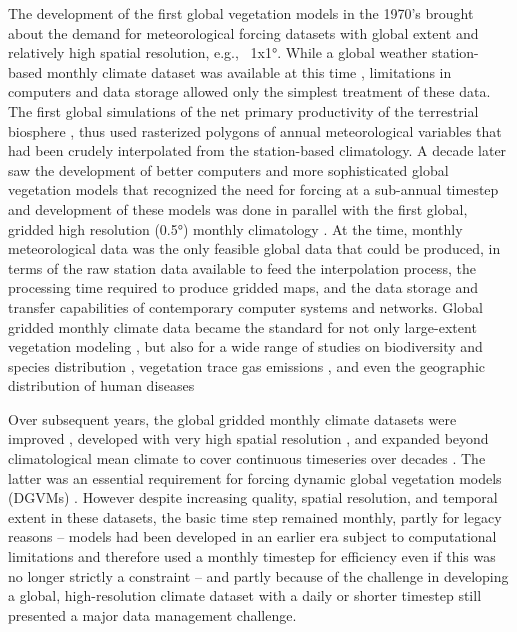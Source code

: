 \begin{refsection}
The development of the first global vegetation models in the 1970’s \citep[e.g.][]{Lieth1975} brought about the demand for meteorological forcing datasets with global extent and relatively high spatial resolution, e.g., ~1x1°. While a global weather station-based monthly climate dataset was available at this time \citep{WalterLieth1967}, limitations in computers and data storage allowed only the simplest treatment of these data. The first global simulations of the net primary productivity of the terrestrial biosphere \citep{Lieth1975}, thus used rasterized polygons of annual meteorological variables that had been crudely interpolated from the station-based climatology. A decade later saw the development of better computers and more sophisticated global vegetation models \citep{PrenticeCramerHarrisonEtAl1992, Prentice1989} that recognized the need for forcing at a sub-annual timestep and development of these models was done in parallel with the first global, gridded high resolution (0.5°) monthly climatology \citep{LeemansCramer1991}. At the time, monthly meteorological data was the only feasible global data that could be produced, in terms of the raw station data available to feed the interpolation process, the processing time required to produce gridded maps, and the data storage and transfer capabilities of contemporary computer systems and networks. Global gridded monthly climate data became the standard for not only large-extent vegetation modeling \citep{HaxeltinePrentice1996a, HaxeltinePrenticeCreswell1996,KaplanBigelowPrenticeEtAl2003, KucharikFoleyDelireEtAl2000, WoodwardSmithEmanuel1995}, but also for a wide range of studies on biodiversity and species distribution \citep[e.g.][]{ElithGrahamAndersonEtAl2006}, vegetation trace gas emissions \citep[e.g.][]{GuentherHewittEricksonEtAl1995}, and even the geographic distribution of human diseases \citep[e.g.][]{BhattGethingBradyEtAl2013}

Over subsequent years, the global gridded monthly climate datasets were improved \citep{NewHulmeJones1999,NewListerHulmeEtAl2002}, developed with very high spatial resolution \citep{HijmansCameronParraEtAl2005}, and expanded beyond climatological mean climate to cover continuous timeseries over decades \citep{HarrisJonesOsbornEtAl2014,MitchellJones2005,NewHulmeJones2000}. The latter was an essential requirement for forcing dynamic global vegetation models (DGVMs) \citep[e.g.][]{SitchSmithPrenticeEtAl2003}. However despite increasing quality, spatial resolution, and temporal extent in these datasets, the basic time step remained monthly, partly for legacy reasons – models had been developed in an earlier era subject to computational limitations and therefore used a monthly timestep for efficiency even if this was no longer strictly a constraint – and partly because of the challenge in developing a global, high-resolution climate dataset with a daily or shorter timestep still presented a major data management challenge.


\end{refsection}

